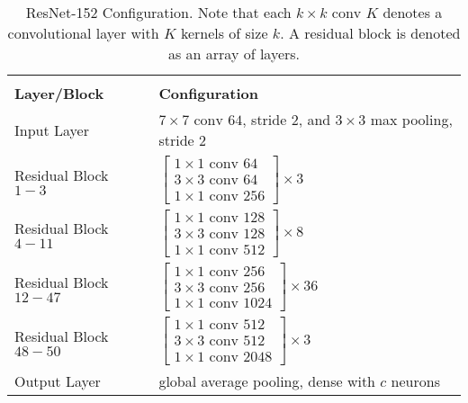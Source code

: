 \begin{xltabular}{\textwidth}{lX}\toprule
	\caption[ResNet-152 Configuration]{ResNet-152 Configuration. Note that each $k \times k \text{ conv } K$ denotes a convolutional layer with $K$ kernels of size  $k$. A residual block is denoted as an array of layers.} \label{tab:resnet}\\
	\textbf{Layer/Block} & \textbf{Configuration}\\\midrule \endhead
	Input Layer & $7 \times 7 \text{ conv } 64$, stride $2$, and $3 \times 3$ max pooling, stride $2$\\\midrule
	Residual Block $1-3$ & $\begin{bmatrix}
	1 \times 1 \text{ conv } 64\\
	3 \times 3 \text{ conv } 64\\
	1 \times 1 \text{ conv } 256
	\end{bmatrix} \times 3$\\\midrule
	Residual Block $4-11$ & $\begin{bmatrix}
	1 \times 1 \text{ conv } 128\\
	3 \times 3 \text{ conv } 128\\
	1 \times 1 \text{ conv } 512
	\end{bmatrix} \times 8$\\\midrule
	Residual Block $12-47$ & $\begin{bmatrix}
	1 \times 1 \text{ conv } 256\\
	3 \times 3 \text{ conv } 256\\
	1 \times 1 \text{ conv } 1024
	\end{bmatrix} \times 36$\\\midrule
	Residual Block $48-50$ & $\begin{bmatrix}
	1 \times 1 \text{ conv } 512\\
	3 \times 3\text{ conv } 512\\
	1 \times 1\text{ conv } 2048
	\end{bmatrix} \times 3$\\\midrule
	Output Layer & global average pooling, dense with $c$ neurons
	\\\bottomrule
\end{xltabular}